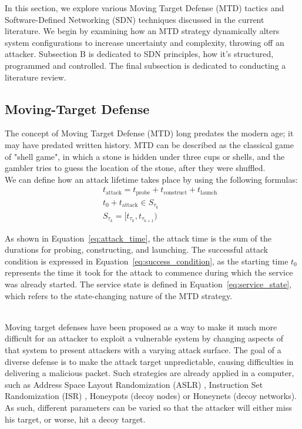 \documentclass[conference]{IEEEtran}
\begin{document}
In this section, we explore various Moving Target Defense (MTD) tactics and Software-Defined Networking (SDN) techniques discussed in the current literature. We begin by examining how an MTD strategy dynamically alters system configurations to increase uncertainty and complexity, throwing off an attacker. Subsection B is dedicated to SDN principles, how it's structured, programmed and controlled. The final subsection is dedicated to conducting a literature review.

\subsection{Moving-Target Defense}
The concept of Moving Target Defense (MTD) long predates the modern age; it may have predated written history. MTD can be described as the classical game of "shell game", in which a stone is hidden under three cups or shells, and the gambler tries to guess the location of the stone, after they were shuffled.
\\
We can define how an attack lifetime takes place by using the following formulas: 
\begin{align}
\quad & t_{\text{attack}} = t_{\text{probe}} + t_{\text{construct}} + t_{\text{launch}} \label{eq:attack_time} \\
\quad & t_0 + t_{\text{attack}} \in S_{\tau_k} \label{eq:success_condition} \\
\quad & S_{\tau_k} = [t_{\tau_k}, t_{\tau_{k+1}}) \label{eq:service_state}
\end{align}

As shown in Equation~\ref{eq:attack_time}, the attack time is the sum of the durations for probing, constructing, and launching. The successful attack condition is expressed in Equation~\ref{eq:success_condition}, as the starting time $t_0$ represents the time it took for the attack to commence during which the service was already started. The service state is defined in Equation~\ref{eq:service_state}, which refers to the state-changing nature of the MTD strategy. 

\\
Moving target defenses have been proposed as a way to make it much more difficult for an attacker to exploit a vulnerable system by changing aspects of that system to present attackers with a varying attack surface\cite{mtd_vol1}. The goal of a diverse defense is to make the attack target unpredictable, causing difficulties in delivering a malicious packet. Such strategies are already applied in a computer, such as Address Space Layout Randomization (ASLR) \cite{shacham2004}, Instruction Set Randomization (ISR) \cite{kc2003}, Honeypots (decoy nodes) or Honeynets (decoy networks). As such, different parameters can be varied so that the attacker will either miss his target, or worse, hit a decoy target.
\end{document}
